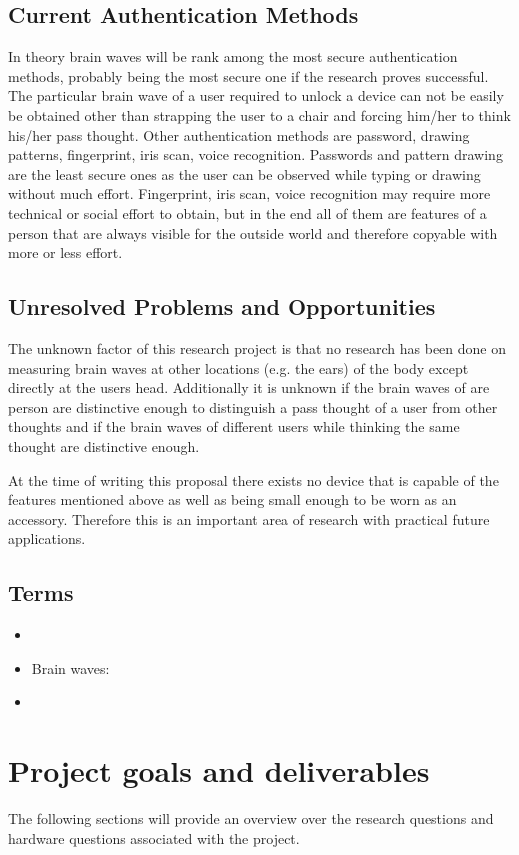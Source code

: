 \documentclass[a4paper,11pt]{article}
\begin{document}
\subsection{Current Authentication Methods}
In theory brain waves will be rank among the most secure authentication methods, probably being the most secure one if the research proves successful. The particular brain wave of a user required to unlock a device can not be easily be obtained other than strapping the user to a chair and forcing him/her to think his/her pass thought. Other authentication methods are password, drawing patterns, fingerprint, iris scan, voice recognition. Passwords and pattern drawing are the least secure ones as the user can be observed while typing or drawing without much effort. Fingerprint, iris scan, voice recognition may require more technical or social effort to obtain, but in the end all of them are features of a person that are always visible for the outside world and therefore copyable with more or less effort.

\subsection{Unresolved Problems and Opportunities}
The unknown factor of this research project is that no research has been done on measuring brain waves at other locations (e.g. the ears) of the body except directly at the users head. Additionally it is unknown if the brain waves of are person are distinctive enough to distinguish a pass thought of a user from other thoughts and if the brain waves of different users while thinking the same thought are distinctive enough.

At the time of writing this proposal there exists no device that is capable of the features mentioned above as well as being small enough to be worn as an accessory. Therefore this is an important area of research with practical future applications.

\subsection{Terms}
\begin{itemize}
	\item 
	\item Brain waves:
	\item
\end{itemize}

\section{Project goals and deliverables}
\label{sect:goals}
The following sections will provide an overview over the research questions and hardware questions associated with the project.
\end{document}
